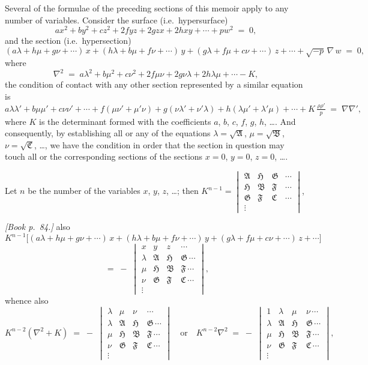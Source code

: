 \documentclass[11pt]{article}
\providecommand{\fA}{\mathfrak{A}}
\providecommand{\fB}{\mathfrak{B}}
\providecommand{\fC}{\mathfrak{C}}
\providecommand{\fF}{\mathfrak{F}}
\providecommand{\fG}{\mathfrak{G}}
\providecommand{\fH}{\mathfrak{H}}
\begin{document}
Several of the formulae of the preceding sections of this memoir apply to any number of variables. Consider the surface (i.e.\ hypersurface)
\[
a x^{2} + b y^{2} + c z^{2} + 2 f y z + 2 g z x + 2 h x y + \cdots + p w^{2} \;=\; 0,
\]
and the section (i.e.\ hypersection)
\[
(a\lambda + h\mu + g\nu + \cdots)\,x + (h\lambda + b\mu + f\nu + \cdots)\,y + (g\lambda + f\mu + c\nu + \cdots)\,z + \cdots + \sqrt{-p}\,\nabla\,w \;=\; 0,
\]
where
\[
\nabla^{2} \;=\; a\lambda^{2} + b\mu^{2} + c\nu^{2} + 2f\mu\nu + 2g\nu\lambda + 2h\lambda\mu + \cdots - K,
\]
the condition of contact with any other section represented by a similar equation is
\[
a\lambda\lambda' + b\mu\mu' + c\nu\nu' + \cdots + f(\mu\nu' + \mu'\nu) + g(\nu\lambda' + \nu'\lambda) + h(\lambda\mu' + \lambda'\mu) + \cdots + K\,\tfrac{\rho\rho'}{p} \;=\; \nabla\nabla',
\]
where $K$ is the determinant formed with the coefficients $a$, $b$, $c$, $f$, $g$, $h$, \ldots. And consequently, by establishing all or any of the equations $\lambda = \sqrt{\fA}$, $\mu = \sqrt{\fB}$, $\nu = \sqrt{\fC}$, \ldots, we have the condition in order that the section in question may touch all or the corresponding sections of the sections $x = 0$, $y = 0$, $z = 0$, \ldots.

Let $n$ be the number of the variables $x$, $y$, $z$, \ldots; then $K^{n-1} = \begin{vmatrix}\fA & \fH & \fG & \cdots\\ \fH & \fB & \fF & \cdots\\ \fG & \fF & \fC & \cdots\\ \vdots & & & \end{vmatrix}$,

\bigskip

\noindent\emph{[Book p.~84.]} also
\[
K^{n-1}\bigl[(a\lambda + h\mu + g\nu + \cdots)\,x + (h\lambda + b\mu + f\nu + \cdots)\,y + (g\lambda + f\mu + c\nu + \cdots)\,z + \cdots\bigr]
\]
\[
\;=\; -\;\begin{vmatrix} x & y & z & \cdots \\ \lambda & \fA & \fH & \fG\,\cdots \\ \mu & \fH & \fB & \fF\,\cdots \\ \nu & \fG & \fF & \fC\,\cdots \\ \vdots \end{vmatrix},
\]
whence also
\[
K^{n-2}(\nabla^{2} + K) \;=\; -\;\begin{vmatrix} \lambda & \mu & \nu & \cdots \\ \lambda & \fA & \fH & \fG\,\cdots \\ \mu & \fH & \fB & \fF\,\cdots \\ \nu & \fG & \fF & \fC\,\cdots \\ \vdots \end{vmatrix}\quad\text{or}\quad K^{n-2}\nabla^{2} \;=\; -\;\begin{vmatrix} 1 & \lambda & \mu & \nu\,\cdots \\ \lambda & \fA & \fH & \fG\,\cdots \\ \mu & \fH & \fB & \fF\,\cdots \\ \nu & \fG & \fF & \fC\,\cdots \\ \vdots \end{vmatrix},
\]
\end{document}
